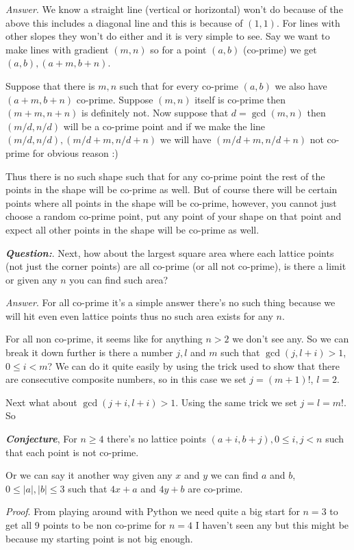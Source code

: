 \documentclass[aps,preprint,preprintnumbers,nofootinbib,showpacs,prd]{revtex4-1}
\begin{document}
\begin{enumerate}
{\it Answer}. We know a straight line (vertical or horizontal) won't do because of the above this includes a diagonal line and this is because of $(1,1)$.  For lines with other slopes they won't do either and it is very simple to see. Say we want to make lines with gradient $(m,n)$ so for a point $(a,b)$ (co-prime) we get $(a,b),(a+m, b+n)$. 

Suppose that there is $m,n$ such that for every co-prime $(a,b)$ we also have $(a+m,b+n)$ co-prime. Suppose $(m,n)$ itself is co-prime then $(m+m,n+n)$ is definitely not. Now suppose that $d = \gcd(m,n)$ then $(m/d, n/d)$ will be a co-prime point and if we make the line $(m/d, n/d), (m/d + m, n/d + n)$ we will have $(m/d + m, n/d + n)$ not co-prime for obvious reason :)

Thus there is no such shape such that for any co-prime point the rest of the points in the shape will be co-prime as well. But of course there will be certain points where all points in the shape will be co-prime, however, you cannot just choose a random co-prime point, put any point of your shape on that point and expect all other points in the shape will be co-prime as well.

\textbf{\textit{Question:}}. Next, how about the largest square area where each lattice points (not just the corner points) are all co-prime (or all not co-prime), is there a limit or given any $n$ you can find such area?

{\it Answer}. For all co-prime it's a simple answer there's no such thing because we will hit even even lattice points thus no such area exists for any $n$.

For all non co-prime, it seems like for anything $n > 2$ we don't see any. So we can break it down further is there a number $j,l$ and $m$ such that $\gcd(j,l+i) > 1$, $0 \le i < m$? We can do it quite easily by using the trick used to show that there are consecutive composite numbers, so in this case we set $j = (m+1)!$, $l = 2$.

Next what about $\gcd(j+i, l+i) > 1$. Using the same trick we set $j = l = m!$. So

\textbf{\textit{Conjecture}}, For $n \ge 4$ there's no lattice points $(a+i,b+j), 0 \le i,j < n$ such that each point is not co-prime.

Or we can say it another way given any $x$ and $y$ we can find $a$ and $b$, $0 \le |a|,|b| \le 3$ such that $4x + a$ and $4y + b$ are co-prime.

{\it Proof}. From playing around with Python we need quite a big start for $n = 3$ to get all 9 points to be non co-prime for $n = 4$ I haven't seen any but this might be because my starting point is not big enough. 


\end{enumerate}
\end{document}
